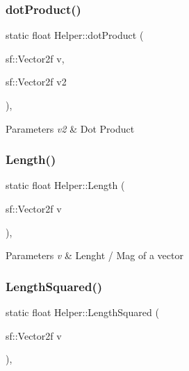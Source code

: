 \subsubsection{\texorpdfstring{dot\+Product()}{dotProduct()}}
{\footnotesize\ttfamily static float Helper\+::dot\+Product (\begin{DoxyParamCaption}\item[{sf\+::\+Vector2f}]{v,  }\item[{sf\+::\+Vector2f}]{v2 }\end{DoxyParamCaption})\hspace{0.3cm}{\ttfamily [inline]}, {\ttfamily [static]}}


\begin{DoxyParams}{Parameters}
{\em v2} & Dot Product \\
\hline
\end{DoxyParams}
\mbox{\label{class_helper_ad2b13a8d9fff4f913a57db9903df7709}} 
\subsubsection{\texorpdfstring{Length()}{Length()}}
{\footnotesize\ttfamily static float Helper\+::\+Length (\begin{DoxyParamCaption}\item[{sf\+::\+Vector2f}]{v }\end{DoxyParamCaption})\hspace{0.3cm}{\ttfamily [inline]}, {\ttfamily [static]}}


\begin{DoxyParams}{Parameters}
{\em v} & Lenght / Mag of a vector \\
\hline
\end{DoxyParams}
\mbox{\label{class_helper_ad6c52dd3a1875fbffc268196a6a6a887}} 
\subsubsection{\texorpdfstring{Length\+Squared()}{LengthSquared()}}
{\footnotesize\ttfamily static float Helper\+::\+Length\+Squared (\begin{DoxyParamCaption}\item[{sf\+::\+Vector2f}]{v }\end{DoxyParamCaption})\hspace{0.3cm}{\ttfamily [inline]}, {\ttfamily [static]}}


